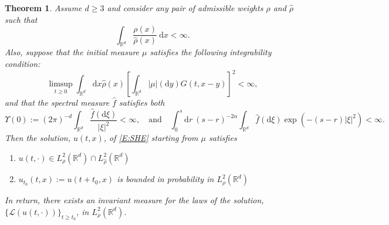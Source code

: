 \documentclass[a4paper,11pt]{article}
\numberwithin{equation}{section}
\theoremstyle{plain}
\newtheorem{theorem}{Theorem}[section]
\theoremstyle{definition}
\newcommand{\ud}{\ensuremath{\mathrm{d} }}
\newcommand{\R}{\mathbb{R}}
\numberwithin{NQ}{section}
\numberwithin{LQ}{section}
\numberwithin{ZQ}{section}
\begin{document}
	\begin{theorem}
	\label{T:InvMeasDelta}
Assume $d \ge 3$ and consider any pair of admissible weights $\rho$ and $\hat{\rho}$ such that
	\[
		\int_{\R^d}\dfrac{\rho(x)}{\hat\rho(x)}\: \ud x < \infty.
	\]
Also, suppose that the initial measure $\mu$ satisfies the following integrability condition:
		\begin{equation}
		\label{A:InvAssumpMeas}
			 \limsup_{t \ge 0}	\int_{\R^d} \ud x \hat{\rho}(x) \left[\int_{\R^d} |\mu|(\ud y) G(t,x-y)\right]^2 < \infty,
		\end{equation}
and that the spectral measure $\hat{f}$ satisfies both 
		\begin{equation}
		\label{A:InvAssumpSpec}
			\Upsilon(0) := (2\pi)^{-d}\int_{\R^d}\dfrac{\hat f(\ud \xi)}{|\xi|^2} < \infty, \quad \text{and} \quad \int_0^s \ud r \: (s-r)^{-2\alpha} \int_{\R^{d}} \hat f(\ud \xi) \exp\left(-(s-r)|\xi|^2 \right) < \infty.
		\end{equation}
Then the solution, $u(t,x)$, of \eqref{E:SHE} starting from $\mu$ satisfies 
	\begin{enumerate}
		\item $u(t,\cdot) \in L^2_{\rho}(\R^d) \cap L^2_{\hat \rho}(\R^d)$
		\item $u_{t_0}(t,x) := u(t+t_0,x)$ is bounded in probability in $L^2_{\rho}(\R^d) $
	\end{enumerate} 
In return, there exists an invariant measure for the laws of the solution, $\{\mathscr L (u(t,\cdot))\}_{t \ge t_0}$,  in $L^2_\rho(\R^d)$.
	\end{theorem}
\end{document}
